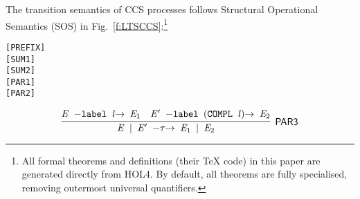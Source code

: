 The transition semantics of CCS processes follows Structural
Operational Semantics (SOS) in Fig.~\ref{f:LTSCCS}:\footnote{All
  formal theorems and definitions (their \TeX{} code) in this paper
  are generated directly from HOL4. By default, all theorems are fully
  specialised, removing outermost universal quantifiers.}
\begin{alltt}
\HOLTokenTurnstile{} \HOLSymConst{\ensuremath{\ldotp}} \HOLTokenTransBegin{}\HOLTokenTransEnd {}\hfill\texttt{[PREFIX]}
\HOLTokenTurnstile{}  \HOLTokenTransBegin{}\HOLTokenTransEnd {} \HOLSymConst{\HOLTokenImp{}}  \HOLSymConst{\ensuremath{+}}  \HOLTokenTransBegin{}\HOLTokenTransEnd {}\hfill\texttt{[SUM1]}
\HOLTokenTurnstile{}  \HOLTokenTransBegin{}\HOLTokenTransEnd {} \HOLSymConst{\HOLTokenImp{}}  \HOLSymConst{\ensuremath{+}}  \HOLTokenTransBegin{}\HOLTokenTransEnd {}\hfill\texttt{[SUM2]}
\HOLTokenTurnstile{}  \HOLTokenTransBegin{}\HOLTokenTransEnd {} \HOLSymConst{\HOLTokenImp{}}  \HOLSymConst{\ensuremath{\mid}}  \HOLTokenTransBegin{}\HOLTokenTransEnd {} \HOLSymConst{\ensuremath{\mid}} \hfill\texttt{[PAR1]}
\HOLTokenTurnstile{}  \HOLTokenTransBegin{}\HOLTokenTransEnd {} \HOLSymConst{\HOLTokenImp{}}  \HOLSymConst{\ensuremath{\mid}}  \HOLTokenTransBegin{}\HOLTokenTransEnd {} \HOLSymConst{\ensuremath{\mid}} \hfill\texttt{[PAR2]}
\end{alltt}

\begin{equation}
\infer[\HOLRuleName{PAR3}]{\HOLinline{\HOLFreeVar{E} \HOLSymConst{\ensuremath{\mid}} \HOLFreeVar{E\sp{\prime}} \HOLTokenTransBegin\HOLSymConst{\ensuremath{\tau}}\HOLTokenTransEnd \HOLFreeVar{E\sb{\mathrm{1}}} \HOLSymConst{\ensuremath{\mid}} \HOLFreeVar{E\sb{\mathrm{2}}}}}{\HOLinline{\HOLFreeVar{E} \HOLTokenTransBegin\HOLConst{label} \HOLFreeVar{l}\HOLTokenTransEnd \HOLFreeVar{E\sb{\mathrm{1}}}}&\HOLinline{\HOLFreeVar{E\sp{\prime}} \HOLTokenTransBegin\HOLConst{label} \ensuremath{(}\HOLConst{COMPL} \HOLFreeVar{l}\ensuremath{)}\HOLTokenTransEnd \HOLFreeVar{E\sb{\mathrm{2}}}}}
\end{equation}

